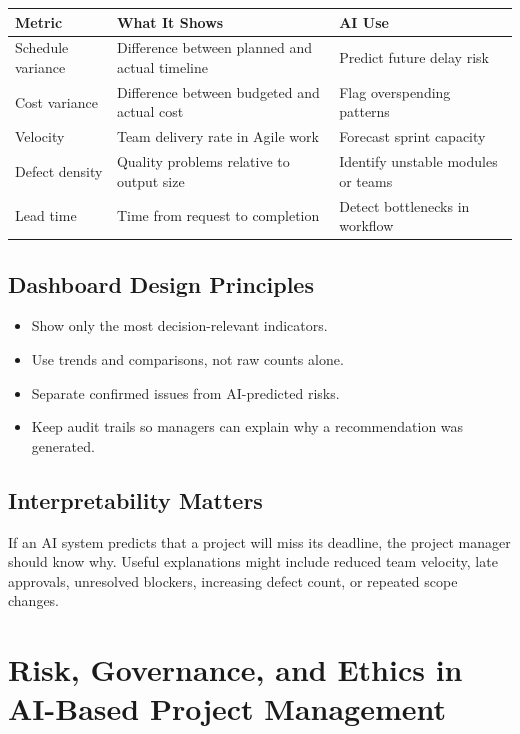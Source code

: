 \documentclass[11pt,a4paper]{article}
\begin{document}
\begin{longtable}{p{3.2cm}p{3.5cm}p{4.8cm}}
\toprule
\textbf{Metric} & \textbf{What It Shows} & \textbf{AI Use} \\
\midrule
Schedule variance & Difference between planned and actual timeline & Predict future delay risk \\
Cost variance & Difference between budgeted and actual cost & Flag overspending patterns \\
Velocity & Team delivery rate in Agile work & Forecast sprint capacity \\
Defect density & Quality problems relative to output size & Identify unstable modules or teams \\
Lead time & Time from request to completion & Detect bottlenecks in workflow \\
\bottomrule
\end{longtable}

\subsection{Dashboard Design Principles}

\begin{itemize}[leftmargin=*]
  \item Show only the most decision-relevant indicators.
  \item Use trends and comparisons, not raw counts alone.
  \item Separate confirmed issues from AI-predicted risks.
  \item Keep audit trails so managers can explain why a recommendation was generated.
\end{itemize}

\subsection{Interpretability Matters}

\begin{conceptbox}
If an AI system predicts that a project will miss its deadline, the project manager should know why. Useful explanations might include reduced team velocity, late approvals, unresolved blockers, increasing defect count, or repeated scope changes.
\end{conceptbox}

\section{Risk, Governance, and Ethics in AI-Based Project Management}
\end{document}
